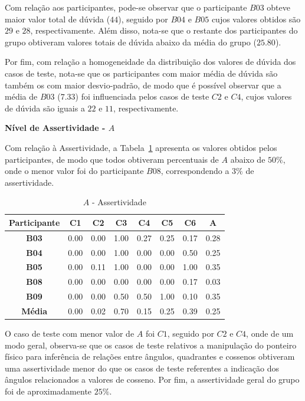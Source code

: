 Com relação aos participantes, pode-se observar que o participante $B03$ obteve maior valor total de dúvida ($44$), seguido por $B04$ e $B05$ cujos valores obtidos são $29$ e $28$, respectivamente. Além disso, nota-se que o restante dos participantes do grupo obtiveram valores totais de dúvida abaixo da média do grupo ($25.80$).

Por fim, com relação a homogeneidade da distribuição dos valores de dúvida dos casos de teste, nota-se que os participantes com maior média de dúvida são também os com maior desvio-padrão, de modo que é possível observar que a média de $B03$ ($7.33$) foi influenciada pelos casos de teste $C2$ e $C4$, cujos valores de dúvida são iguais a $22$ e $11$, respectivamente.

\textbf{Nível de Assertividade - $A$}

Com relação à Assertividade, a Tabela~\ref{tab:F3_A4_A} apresenta os valores obtidos pelos participantes, de modo que todos obtiveram percentuais de $A$ abaixo de $50\%$, onde o menor valor foi do participante $B08$, correspondendo a $3\%$ de assertividade.

\begin{table}[htbp]
	\centering
	\caption{$A$ - Assertividade}
	\begin{tabular}{|c|c|c|c|c|c|c|c|}
		\hline
		\rowcolor[HTML]{D9D9D9} 
		\textbf{Participante} & \textbf{C1} & \textbf{C2} & \textbf{C3} & \textbf{C4} & \textbf{C5} & \textbf{C6} & \textbf{A} \\ \hline
		\rowcolor[HTML]{FFFFFF} 
		\textbf{B03} & 0.00 & 0.00 & 1.00 & 0.27 & 0.25 & 0.17 & 0.28 \\ \hline
		\rowcolor[HTML]{E7E6E6} 
		\textbf{B04} & 0.00 & 0.00 & 1.00 & 0.00 & 0.00 & 0.50 & 0.25 \\ \hline
		\rowcolor[HTML]{FFFFFF} 
		\textbf{B05} & 0.00 & 0.11 & 1.00 & 0.00 & 0.00 & 1.00 & 0.35 \\ \hline
		\rowcolor[HTML]{E7E6E6} 
		\textbf{B08} & 0.00 & 0.00 & 0.00 & 0.00 & 0.00 & 0.17 & 0.03 \\ \hline
		\rowcolor[HTML]{FFFFFF} 
		\textbf{B09} & 0.00 & 0.00 & 0.50 & 0.50 & 1.00 & 0.10 & 0.35 \\ \hline
		\rowcolor[HTML]{D0CECE} 
		\textbf{Média} & 0.00 & 0.02 & 0.70 & 0.15 & 0.25 & 0.39 & 0.25 \\ \hline
	\end{tabular}
	\label{tab:F3_A4_A}
\end{table}

O caso de teste com menor valor de $A$ foi $C1$, seguido por $C2$ e $C4$, onde de um modo geral, observa-se que os casos de teste relativos a manipulação do ponteiro físico para inferência de relações entre ângulos, quadrantes e cossenos obtiveram uma assertividade menor do que os casos de teste referentes a indicação dos ângulos relacionados a valores de cosseno. Por fim, a assertividade geral do grupo foi de aproximadamente $25\%$.

